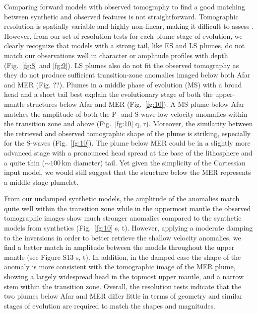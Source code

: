 \documentclass[a4paper,10pt,twocolumn]{paper}
\begin{document}
Comparing forward models with observed tomography to find a good matching between synthetic and observed features is not straightforward. Tomographic resolution is spatially variable and highly non-linear, making it difficult to assess \citep{rawlinson-etal-2010}. However, from our set of resolution tests for each plume stage of evolution, we clearly recognize that models with a strong tail, like ES and LS plumes, do not match our observations well in character or amplitude profiles with depth (Fig.~\ref{fg:8} and \ref{fg:9}). LS plumes also do not fit the observed tomography as they do not produce sufficient transition-zone anomalies imaged below both Afar and MER (Fig. ??).  Plumes in a middle phase of evolution (MS) with a broad head and a short tail best explain the evolutionary stage of both the upper-mantle structures below Afar and MER (Fig.~\ref{fg:10}). A MS plume below Afar matches the amplitude of both the P- and S-wave low-velocity anomalies within the transition zone and above (Fig.~\ref{fg:10} q, r). Moreover, the similarity between the retrieved and observed tomographic shape of the plume is striking, especially for the S-waves (Fig.~\ref{fg:10}). The plume below MER could be in a slightly more advanced stage with a pronounced head spread at the base of the lithosphere and a quite thin ($\sim 100$\,km diameter) tail. Yet given the simplicity of the Cartessian input model, we would still suggest that the structure below the MER represents a middle stage plumelet.

From our undamped synthetic models, the amplitude of the anomalies match quite well within the transition zone while in the uppermost mantle the observed tomographic images show much stronger anomalies compared to the synthetic models from synthetics (Fig.~\ref{fg:10} s, t). However, applying a moderate damping to the inversions in order to better retrieve the shallow velocity anomalies, we find a better match in amplitude between the models throughout the upper mantle (see Figure S13 s, t). In addition, in the damped case the shape of the anomaly is more consistent with the tomographic image of the MER plume, showing a largely widespread head in the topmost upper mantle, and a narrow stem within the transition zone. Overall, the resolution tests indicate that the two plumes below Afar and MER differ little in terms of geometry and similar stages of evolution are required to match the shapes and magnitudes.
\end{document}
